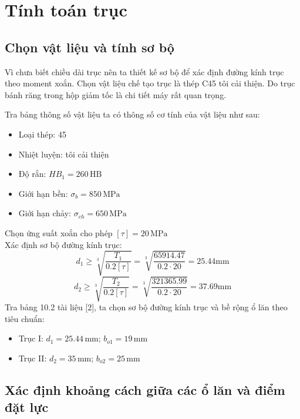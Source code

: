 \chapter{Tính toán trục}
\section{Chọn vật liệu và tính sơ bộ}
Vì chưa biết chiều dài trục nên ta thiết kế sơ bộ để xác định đường kính trục theo moment xoắn. 
Chọn vật liệu chế tạo trục là thép C45 tôi cải thiện. Do trục bánh răng trong hộp giảm tốc là chi tiết máy rất quan trọng.

Tra bảng thông số vật liệu ta có thông số cơ tính của vật liệu như sau:
\begin{itemize}
    \item Loại thép: 45
    \item Nhiệt luyện: tôi cải thiện
    \item Độ rắn: $HB_1 = 260 \, \text{HB}$
    \item Giới hạn bền: $\sigma_b = 850 \, \text{MPa}$
    \item Giới hạn chảy: $\sigma_{ch} = 650 \, \text{MPa}$
\end{itemize}
Chọn ứng suất xoắn cho phép $[\tau] = 20 \, \text{MPa}$ \\
Xác định sơ bộ đường kính trục:
\[
d_1 \geq \sqrt[3]{\frac{T_1}{0.2[\tau]}} = \sqrt[3]{\frac{65914.47}{0.2 \cdot 20}} = 25.44 \text{mm}
\]
\[
d_2 \geq \sqrt[3]{\frac{T_2}{0.2[\tau]}} = \sqrt[3]{\frac{321365.99}{0.2 \cdot 20}} = 37.69 \text{mm}
\]
Tra bảng 10.2 tài liệu [2], ta chọn sơ bộ đường kính trục và bề rộng ổ lăn theo tiêu chuẩn:
\begin{itemize}
    \item Trục I: $d_1 = 25.44 \, \text{mm}$; $b_{o1} = 19 \, \text{mm}$
    \item Trục II: $d_2 = 35 \, \text{mm}$; $b_{o2} = 25 \, \text{mm}$  
\end{itemize}
\section{Xác định khoảng cách giữa các ổ lăn và điểm đặt lực}
